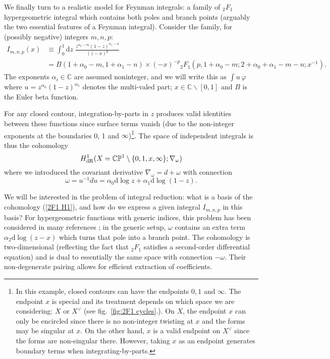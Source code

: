\documentclass[11pt]{article}
\renewcommand{\d}{\text{d}}
\newcommand{\be}{\begin{equation}}
\newcommand{\ee}{\end{equation}}
\newcommand{\CP}{\mathbb{CP}}
\newcommand{\re}{{\rm Re}}
\newcommand{\vphi}{\varphi}
\begin{document}
We finally turn to a realistic model for Feynman integrals: a family of ${}_2F_1$ hypergeometric integral which contains
both poles and branch points (arguably the two essential features of a Feynman integral).
Consider the family, for (possibly negative) integers $m,n,p$:
\be\begin{aligned}
I_{m,n,p}(x) &\equiv \int_0^1 \d z\; \frac{z^{\alpha_0-m} (1-z)^{\alpha_1-n}}{(z-x)^p}
\\ &= B(1{+}\alpha_0{-}m,1{+}\alpha_1{-}n)\times (-x)^{-p} {_2F_1}(p,1{+}\alpha_0{-}m;2{+}\alpha_0{+}\alpha_1{-}m{-}n;x^{-1}).
\end{aligned}\label{2F1 family}\ee
The exponents $\alpha_i\in\mathbb{C}$ are assumed noninteger, and we will write this as $\int u\ \vphi$
where $u=z^{\alpha_0} (1-z)^{\alpha_1}$ denotes the multi-valed part; $x \in\mathbb C \backslash [0,1]$ and $B$ is the Euler beta function.

For any closed contour, integration-by-parts in $z$ produces valid identities between these functions since surface terms vanish (due to the non-integer exponents at the boundaries 0, 1 and $\infty$)\footnote{In this example, closed contours  can have the endpoints $0,1$ and $\infty$. The endpoint $x$ is special and its treatment depends on which space we are considering: $X$ or $X^\vee$ (see fig.~\ref{fig:2F1 cycles}.). On $X$, the endpoint $x$ can only be encircled since there is no non-integer twisting at $x$ and the forms may be singular at $x$. On the other hand, $x$ is a valid endpoint on $X^\vee$ since the forms are non-singular there. However, taking $x$ as an endpoint generates boundary terms when integrating-by-parts. }. 
The space of independent integrals is thus the cohomology
\be
 H^1_{\rm dR}(X=\CP^1\setminus\{0,1,x,\infty\};\nabla_\omega) \label{2F1 H1}
\ee
where we introduced the covariant derivative $\nabla_\omega=d+\omega$ with connection
\be
 \omega= u^{-1}du = \alpha_0 \d\log z + \alpha_1 \d\log(1-z).
\ee

We will be interested in the problem of integral reduction:
what is a basis of the cohomology (\ref{2F1 H1}), and how do we express a given integral $I_{m,n,p}$ in this basis?
For hypergeometric functions with generic indices, this problem has been considered in many references \cite{aomoto1975,cho_matsumoto_1995,AOMOTO1997119,matsumoto1998,aomoto2011theory,aomoto2012,aomoto2015,Aomoto:2017npl};
in the generic setup, $\omega$ contains an extra term $\alpha_2 \d\log(z-x)$ which turns that pole into a branch point.
The cohomology is two-dimensional (reflecting the fact that ${}_2F_1$ satisfies a second-order differential equation)
and is dual to essentially the same space with connection $-\omega$.
Their non-degenerate pairing allows for efficient extraction of coefficients. 
\end{document}
